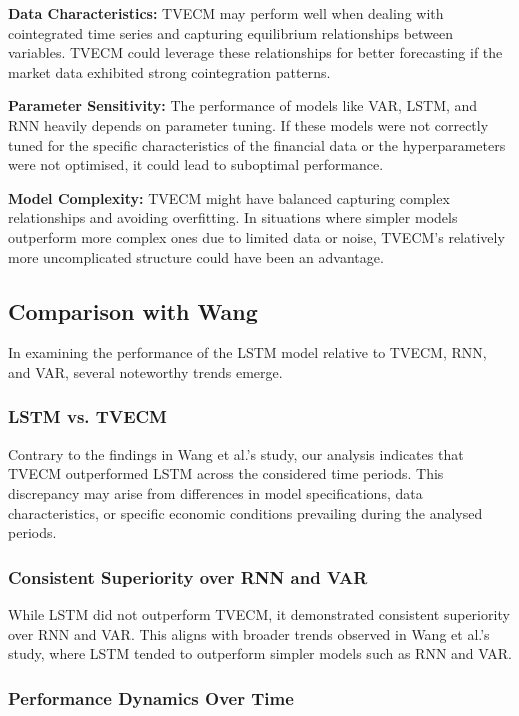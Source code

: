\documentclass[a4paper,10pt]{article}
\begin{document}
\textbf{Data Characteristics:} TVECM may perform well when dealing with cointegrated time series and capturing equilibrium relationships between variables. TVECM could leverage these relationships for better forecasting if the market data exhibited strong cointegration patterns.

\textbf{Parameter Sensitivity:} The performance of models like VAR, LSTM, and RNN heavily depends on parameter tuning. If these models were not correctly tuned for the specific characteristics of the financial data or the hyperparameters were not optimised, it could lead to suboptimal performance.

\textbf{Model Complexity:} TVECM might have balanced capturing complex relationships and avoiding overfitting. In situations where simpler models outperform more complex ones due to limited data or noise, TVECM's relatively more uncomplicated structure could have been an advantage.

\subsection{Comparison with Wang}

In examining the performance of the LSTM model relative to TVECM, RNN, and VAR, several noteworthy trends emerge. 

\subsubsection{LSTM vs. TVECM}

Contrary to the findings in Wang et al.'s study, our analysis indicates that TVECM outperformed LSTM across the considered time periods. This discrepancy may arise from differences in model specifications, data characteristics, or specific economic conditions prevailing during the analysed periods.

\subsubsection{Consistent Superiority over RNN and VAR}

While LSTM did not outperform TVECM, it demonstrated consistent superiority over RNN and VAR. This aligns with broader trends observed in Wang et al.'s study, where LSTM tended to outperform simpler models such as RNN and VAR.

\subsubsection{Performance Dynamics Over Time}
\end{document}
